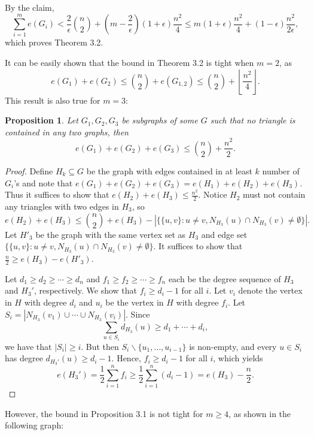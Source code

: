 \documentclass[12pt]{report}
\newtheorem{proposition}[theorem]{Proposition}
\begin{document}
By the claim, 
\[
  \sum_{i = 1}^m e(G_i) < \frac{2}{\epsilon}\binom{n}{2} + \left(m - \frac{2}{\epsilon}\right)(1 + \epsilon)\frac{n^2}{4} \leq m(1 + \epsilon)\frac{n^2}{4} + (1 - \epsilon)\frac{n^2}{2\epsilon},
\]
which proves Theorem 3.2.

It can be easily shown that the bound in Theorem 3.2 is tight when $m = 2$, as
\[
	e(G_1) + e(G_2) \leq \binom{n}{2} + e(G_{1, 2}) \leq \binom{n}{2} + \left\lfloor \frac{n^2}{4} \right\rfloor.
\]
This result is also true for $m = 3$:

\begin{proposition}
	Let $G_1, G_2, G_3$ be subgraphs of some $G$ such that no triangle is contained in any two graphs,
	then
	\[
		e(G_1) + e(G_2) + e(G_3) \leq \binom{n}{2} + \frac{n^2}{2}.
	\]
\end{proposition}

\begin{proof}
  Define $H_k \subseteq G$ be the graph with edges contained in at least $k$ number of $G_i$'s and
  note that $e(G_1) + e(G_2) + e(G_3) = e(H_1) + e(H_2) + e(H_3)$. Thus it suffices to show that
  $e(H_2) + e(H_3) \leq \frac{n^2}{2}$. Notice $H_2$ must not contain any triangles with two edges
  in $H_3$, so
  \[
    e(H_2) + e(H_3) \leq \binom{n}{2} + e(H_3) - |\{\{u, v\} : u \neq v, N_{H_3}(u) \cap N_{H_3}(v) \neq \emptyset\}|.
  \]
  Let $H'_3$ be the graph with the same vertex set as $H_3$ and edge set $\{\{u, v\} : u \neq v,
  N_{H_3}(u) \cap N_{H_3}(v) \neq \emptyset\}$. It suffices to show that $\frac{n}{2} \geq e(H_3) -
  e(H'_3)$. 

  Let $d_1 \geq d_2 \geq \cdots \geq d_n$ and $f_1 \geq f_2 \geq \cdots \geq f_n$ each be the degree
  sequence of $H_3$ and $H_3'$, respectively. We show that $f_i \geq d_i - 1$ for all $i$. Let $v_i$
  denote the vertex in $H$ with degree $d_i$ and $u_i$ be the vertex in $H$ with degree $f_i$. Let
  $S_i = |N_{H_3}(v_1) \cup \cdots \cup N_{H_3}(v_i)|$. Since 
  \[
    \sum_{u \in S_i} d_{H_3}(u) \geq d_1 + \cdots + d_i,
  \]
  we have that $|S_i| \geq i$. But then $S_i \backslash \{u_1, \ldots, u_{i - 1}\}$ is non-empty,
  and every $u \in S_i$ has degree $d_{H_3'}(u) \geq d_i - 1$. Hence, $f_i \geq d_i - 1$ for all
  $i$, which yields
  \[
    e(H_3') = \frac{1}{2}\sum_{i = 1}^n f_i \geq \frac{1}{2}\sum_{i = 1}^n (d_i - 1) = e(H_3) - \frac{n}{2}.
  \]
\end{proof}

However, the bound in Proposition 3.1 is not tight for $m \geq 4$, as shown in the following graph:
\end{document}
